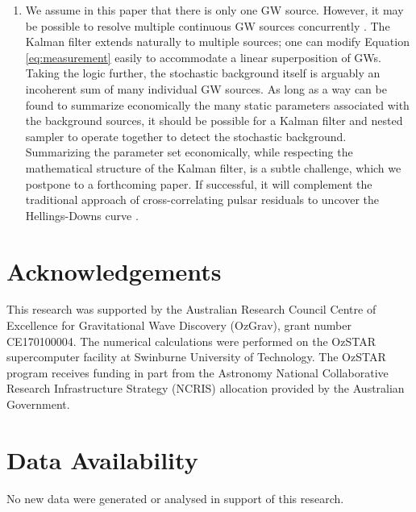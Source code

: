 \documentclass[fleqn,usenatbib,useAMS]{mnras}
\begin{document}
\begin{enumerate}[leftmargin=2em]
	
	\item We assume in this paper that there is only one GW source. However, it may be possible to resolve multiple continuous GW sources concurrently \citep{PhysRevD.85.044034}. The Kalman filter extends naturally to multiple sources; one can modify Equation \eqref{eq:measurement} easily to accommodate a linear superposition of GWs. Taking the logic further, the stochastic background itself is arguably an incoherent sum of many individual GW sources. As long as a way can be found to summarize economically the many static parameters associated with the background sources, it should be possible for a Kalman filter and nested sampler to operate together to detect the stochastic background. Summarizing the parameter set economically, while respecting the mathematical structure of the Kalman filter, is a subtle challenge, which we postpone to a forthcoming paper. If successful, it will complement the traditional approach of cross-correlating pulsar residuals to uncover the Hellings-Downs curve \citep{Hellings,2023ApJ...951L...8A}.
\end{enumerate}







\section*{Acknowledgements}
This research was supported by the Australian Research Council Centre of Excellence for Gravitational Wave Discovery (OzGrav), grant number CE170100004. The numerical calculations were performed on the OzSTAR supercomputer facility at Swinburne University of Technology. The OzSTAR program receives funding in part from the Astronomy National Collaborative Research Infrastructure Strategy (NCRIS) allocation provided by the Australian Government.


\section*{Data Availability}
No new data were generated or analysed in support of this research.






\appendix
\newpage
\newpage
\clearpage
\end{document}
